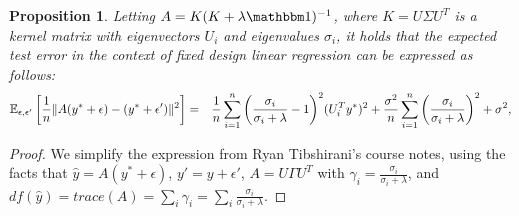 \documentclass[12pt]{article}
\newcommand{\hy}{\hat{y}}
\newcommand{\eps}{\epsilon}
\newtheorem{proposition}[theorem]{Proposition}
\begin{document}
\begin{proposition}
	Letting $A=K(K+\lambda\id)^{-1}$, where $K=U\Sigma U^T$ is a kernel matrix with eigenvectors $U_i$ and eigenvalues $\sigma_i$, it holds that the expected test error in the context of fixed design linear regression can be expressed as follows:
\begin{eqnarray*}
	\expect{\epsilon,\epsilon'}{\frac{1}{n}\|A(y^*+\eps) - (y^*+\eps')\|^2} 
	&=& \frac{1}{n}\sum_{i=1}^n \bigg(\frac{\sigma_i}{\sigma_i + \lambda}-1\bigg)^2 (U_i^T y^*)^2 + \frac{\sigma^2}{n}\sum_{i=1}^n \bigg(\frac{\sigma_i}{\sigma_i + \lambda}\bigg)^2 + \sigma^2,
\end{eqnarray*}	
\end{proposition}
\begin{proof}
We simplify the expression from Ryan Tibshirani's course notes, using the facts that $\hy = A(y^* + \eps)$, $y' = y + \eps'$, $A = U\Gamma U^T$ with $\gamma_i = \frac{\sigma_i}{\sigma_i + \lambda}$, and $df(\hy) = trace(A) = \sum_i \gamma_i = \sum_i \frac{\sigma_i}{\sigma_i + \lambda}$.


\end{proof}
\end{document}
